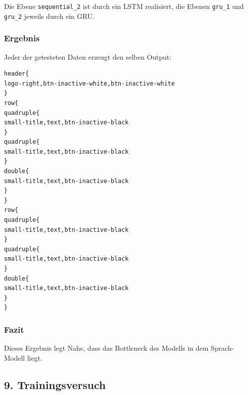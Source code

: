 \documentclass[pdftex,a4paper,halfparskip, article]{scrartcl}
\begin{document}
Die Ebene \texttt{sequential\_2} ist durch ein LSTM realisiert, die Ebenen \texttt{gru\_1} und \texttt{gru\_2} jeweils durch ein GRU. 

\subsubsection*{Ergebnis}

Jeder der getesteten Daten erzeugt den selben Output:
\begin{verbatim}
header{
logo-right,btn-inactive-white,btn-inactive-white
}
row{
quadruple{
small-title,text,btn-inactive-black
}
quadruple{
small-title,text,btn-inactive-black
}
double{
small-title,text,btn-inactive-black
}
}
row{
quadruple{
small-title,text,btn-inactive-black
}
quadruple{
small-title,text,btn-inactive-black
}
double{
small-title,text,btn-inactive-black
}
}
\end{verbatim}

\subsubsection*{Fazit}

Dieses Ergebnis legt Nahe, dass das Bottleneck des Modells in dem Sprach-Modell liegt. 

\subsection{9. Trainingsversuch}

\end{document}
